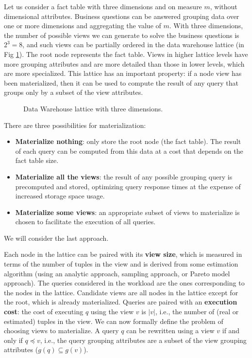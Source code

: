 Let us consider a fact table with three dimensions and on measure $m$, without dimensional attributes. Business questions can be answered grouping data over one or more dimensions and aggregating the value of $m$. With three dimensions, the number of possible views we can generate to solve the business questions is $2^3 = 8$, and such views can be partially ordered in the data warehouse lattice (in Fig \ref{fig:lattice}). The root node represents the fact table. Views in higher lattice levels have more grouping attributes and are more detailed than those in lower levels, which are more specialized. This lattice has an important property: if a node view has been materialized, then it can be used to compute the result of any query that groups only by a subset of the view attributes.
\begin{figure}[ht]
    \centering
    
    \caption{Data Warehouse lattice with three dimensions.}
    \label{fig:lattice}
\end{figure}
There are three possibilities for materialization:
\begin{itemize}
    \item \textbf{Materialize nothing}: only store the root node (the fact table). The result of each query can be computed from this data at a cost that depends on the fact table size.
    \item \textbf{Materialize all the views}: the result of any possible grouping query is precomputed and stored, optimizing query response times at the expense of increased storage space usage.
    \item \textbf{Materialize some views}: an appropriate subset of views to materialize is chosen to facilitate the execution of all queries.
\end{itemize}
We will consider the last approach.

Each node in the lattice can be paired with its \textbf{view size}, which is measured in terms of the number of tuples in the view and is derived from some estimation algorithm (using an analytic approach, sampling approach, or Pareto model approach). The queries considered in the workload are the ones corresponding to the nodes in the lattice. Candidate views are all nodes in the lattice except for the root, which is already materialized. Queries are paired with an \textbf{execution cost}: the cost of executing $q$ using the view $v$ is $|v|$, i.e., the number of (real or estimated) tuples in the view. We can now formally define the problem of choosing views to materialize. A query $q$ can be rewritten using a view $v$ if and only if $q \preceq v$, i.e., the query grouping attributes are a subset of the view grouping attributes ($g(q) \subseteq g(v)$).

